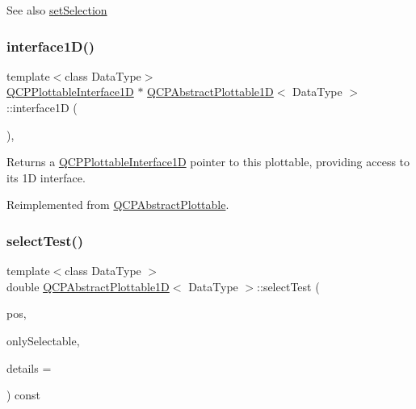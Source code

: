\begin{DoxySeeAlso}{See also}
\mbox{\hyperlink{class_q_c_p_abstract_plottable_a219bc5403a9d85d3129165ec3f5ae436}{set\+Selection}} 
\end{DoxySeeAlso}
\mbox{\label{class_q_c_p_abstract_plottable1_d_a3ab7511c279af967955369606c584dd6}} 
\subsubsection{\texorpdfstring{interface1\+D()}{interface1D()}}
{\footnotesize\ttfamily template$<$class Data\+Type$>$ \\
\mbox{\hyperlink{class_q_c_p_plottable_interface1_d}{Q\+C\+P\+Plottable\+Interface1D}} $\ast$ \mbox{\hyperlink{class_q_c_p_abstract_plottable1_d}{Q\+C\+P\+Abstract\+Plottable1D}}$<$ Data\+Type $>$\+::interface1D (\begin{DoxyParamCaption}{ }\end{DoxyParamCaption})\hspace{0.3cm}{\ttfamily [inline]}, {\ttfamily [virtual]}}

Returns a \mbox{\hyperlink{class_q_c_p_plottable_interface1_d}{Q\+C\+P\+Plottable\+Interface1D}} pointer to this plottable, providing access to its 1D interface.

Reimplemented from \mbox{\hyperlink{class_q_c_p_abstract_plottable_a81fd9fd5c4f429c074785e2eb238a8e7}{Q\+C\+P\+Abstract\+Plottable}}.

\mbox{\label{class_q_c_p_abstract_plottable1_d_a071e2df66ba1746067dfcb5e27947b43}} 
\subsubsection{\texorpdfstring{select\+Test()}{selectTest()}}
{\footnotesize\ttfamily template$<$class Data\+Type $>$ \\
double \mbox{\hyperlink{class_q_c_p_abstract_plottable1_d}{Q\+C\+P\+Abstract\+Plottable1D}}$<$ Data\+Type $>$\+::select\+Test (\begin{DoxyParamCaption}\item[{const Q\+PointF \&}]{pos,  }\item[{bool}]{only\+Selectable,  }\item[{Q\+Variant $\ast$}]{details = {} }\end{DoxyParamCaption}) const\hspace{0.3cm}{\ttfamily [virtual]}}

